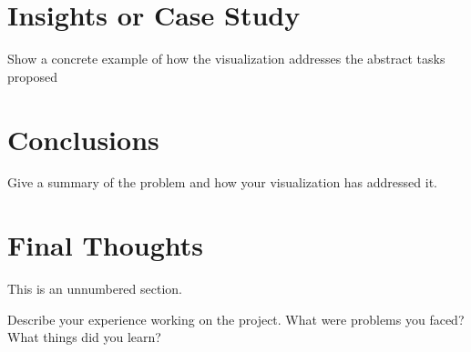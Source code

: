 \documentclass[journal]{vgtc}                %
\begin{document}
\section{Insights or Case Study}
Show a concrete example of how the visualization addresses the abstract tasks proposed

\section{Conclusions}
Give a summary of the problem and how your visualization has addressed it.


\section*{Final Thoughts}
This is an unnumbered section.

Describe your experience working on the project. What were problems you faced? What things did you learn?




\end{document}
